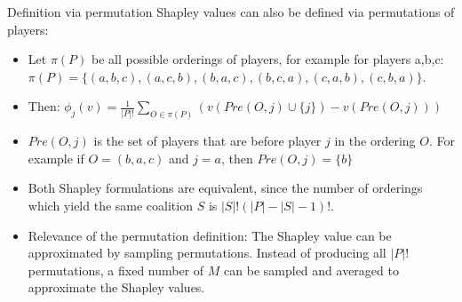 \documentclass[11pt,compress,t,notes=noshow, xcolor=table]{beamer}
\begin{document}
\begin{vbframe}{Definition via permutation}
 Shapley values can also be defined via permutations of players:
\begin{itemize}
  \item Let $\pi(P)$ be all possible orderings of players, for example for players a,b,c: $\pi(P) = \{(a,b,c), (a,c,b), (b,a,c), (b,c,a), (c,a,b), (c,b,a)\}$.
  \item Then: $\phi_j(v) = \frac{1}{|P|!} \sum_{O \in \pi(P)} (v(Pre(O,j) \cup \{j\}) - v(Pre(O,j)))$
  \item $Pre(O,j)$ is the set of players that are before player $j$ in the ordering $O$. For example if $O = (b,a,c)$ and $j=a$, then $Pre(O,j) = \{b\}$
  \item Both Shapley formulations are equivalent, since the number of orderings which yield the same coalition $S$ is  $|S|!(|P| - |S| - 1)!$.
  \item Relevance of the permutation definition: The Shapley value can be approximated by sampling permutations. Instead of producing all $|P|!$ permutations, a fixed number of $M$ can be sampled and averaged to approximate the Shapley values.
\end{itemize}

\tiny{}

\end{vbframe}
\end{document}
